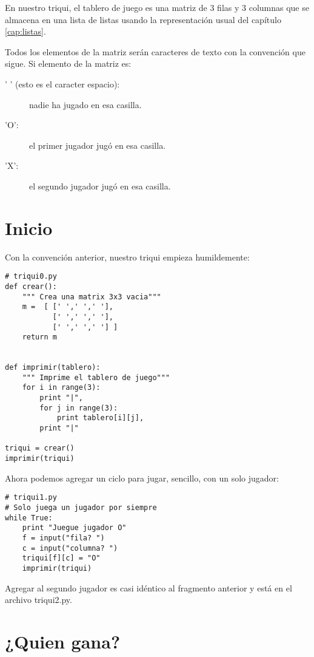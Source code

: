 En nuestro triqui, el tablero de juego es una matriz de 3 filas y 3 columnas que
se almacena en una lista de listas usando la representación usual del capítulo 
\ref{cap:listas}. 

Todos los elementos de la matriz serán caracteres de texto con la 
convención que sigue. Si elemento de la matriz es:

\begin{description}
  \item[' ' (esto es el caracter espacio):]   nadie ha jugado en esa casilla.
  \item['O': ] el primer jugador jugó en esa casilla.
  \item['X':] el segundo jugador jugó en esa casilla.
\end{description}

\section{Inicio}

Con la convención anterior, nuestro triqui empieza humildemente:

\beforeverb
\begin{verbatim}
# triqui0.py
def crear():
    """ Crea una matrix 3x3 vacia"""
    m =  [ [' ',' ',' '],
           [' ',' ',' '],
           [' ',' ',' '] ]
    return m


def imprimir(tablero):
    """ Imprime el tablero de juego"""
    for i in range(3):
        print "|",
        for j in range(3):
            print tablero[i][j],
        print "|"
        
triqui = crear()
imprimir(triqui)
\end{verbatim}
\afterverb

Ahora podemos agregar un ciclo para jugar, sencillo, con un solo jugador:

\beforeverb
\begin{verbatim}
# triqui1.py
# Solo juega un jugador por siempre 
while True:
    print "Juegue jugador O"
    f = input("fila? ")
    c = input("columna? ")
    triqui[f][c] = "O"
    imprimir(triqui)
\end{verbatim}
\afterverb

Agregar al segundo jugador es casi idéntico al fragmento anterior y  está en el 
archivo triqui2.py. 

\section{¿Quien gana?}

